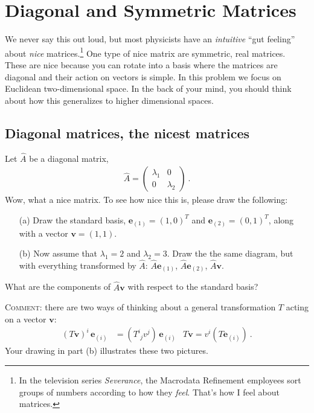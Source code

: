 \documentclass[12pt]{article}
\numberwithin{equation}{section}    %
\renewcommand{\vec}[1]{\mathbf{#1}} %
\begin{document}
\section{Diagonal and Symmetric Matrices}\label{sec:matrixspace}

We never say this out loud, but most physicists have an \emph{intuitive} ``gut feeling'' about \emph{nice} matrices.\footnote{In the television series \emph{Severance}, the Macrodata Refinement employees sort groups of numbers according to how they \emph{feel}. That's how I feel about matrices.} One type of nice matrix are symmetric, real matrices. These are nice because you can rotate into a basis where the matrices are diagonal and their action on vectors is simple. In this problem we focus on Euclidean two-dimensional space. In the back of your mind, you should think about how this generalizes to higher dimensional spaces.

\subsection{Diagonal matrices, the nicest matrices}

Let $\hat A$ be a diagonal matrix,
\begin{align}
	\hat A = 
	\begin{pmatrix}
		\lambda_1 &  0 \\
		0 & \lambda_2
	\end{pmatrix} \ .
	\label{eq:Ahat}
\end{align}
Wow, what a nice matrix. To see how nice this is, please draw the following:
\begin{itemize}
	\item[(a)] Draw the standard basis, $\vec{e}_{(1)} = (1,0)^T$ and $\vec{e}_{(2)} = (0,1)^T$, along with a vector $\vec{v} = (1,1)$.
	\item[(b)] Now assume that $\lambda_1 = 2$ and $\lambda_2 = 3$. Draw the the same diagram, but with everything transformed by $\hat{A}$: $\hat{A} \vec{e}_{(1)}$, $\hat{A} \vec{e}_{(2)}$, $\hat A\vec{v}$.
\end{itemize}
What are the components of $\hat A\vec{v}$ with respect to the standard basis?

\textsc{Comment}: there are two ways of thinking about a general transformation $T$ acting on a vector $\vec{v}$:
\begin{align}
	\left(T \vec{v}\right)^i \, \vec{e}_{(i)} &= \left(T^{i}_{\phantom{i}j}v^j\right)\, \vec{e}_{(i)}
	&
	T \vec{v} = v^i \left(T \vec{e}_{(i)}\right) \ .
\end{align}
Your drawing in part (b) illustrates these two pictures. 
\end{document}
